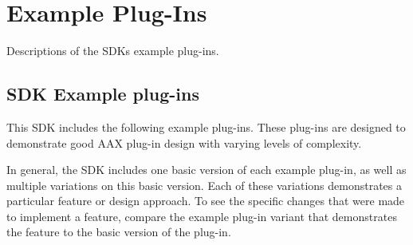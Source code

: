 \hypertarget{a00376}{}\section{Example Plug-\/\+Ins}
\label{a00376}
Descriptions of the S\+D\+K\textquotesingle{}s example plug-\/ins. 

\hypertarget{a00376_examples}{}\subsection{S\+D\+K Example plug-\/ins}\label{a00376_examples}
This S\+D\+K includes the following example plug-\/ins. These plug-\/ins are designed to demonstrate good A\+A\+X plug-\/in design with varying levels of complexity.

In general, the S\+D\+K includes one basic version of each example plug-\/in, as well as multiple variations on this basic version. Each of these variations demonstrates a particular feature or design approach. To see the specific changes that were made to implement a feature, compare the example plug-\/in variant that demonstrates the feature to the basic version of the plug-\/in.

